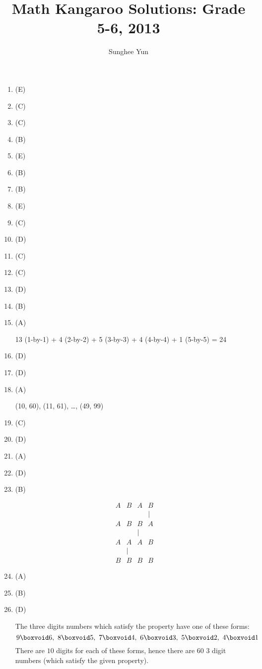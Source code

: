 \documentclass{article}
\title{Math Kangaroo Solutions: Grade 5-6, 2013}
\author{Sunghee Yun}
\begin{document}
\maketitle

\begin{enumerate}
\item (E)
\item (C)
\item (C)
\item (B)
\item (E)
\item (B)
\item (B)
\item (E)
\item (C)
\item (D)
\item (C)
\item (C)
\item (D)
\item (B)
\item (A)
\begin{solution}
13 (1-by-1)
+ 4 (2-by-2)
+ 5 (3-by-3)
+ 4 (4-by-4)
+ 1 (5-by-5)
= 24
\end{solution}
\item (D)
\item (D)
\item (A)
\begin{solution}
(10, 60), (11, 61), \ldots, (49, 99)
\end{solution}
\item (C)
\item (D)
\item (A)
\item (D)
\item (B)
\begin{solution}
\[
\begin{array}{cccc}
A&B&A&B
\\
 & & &|
\\
A&B&B&A
\\
 & &|
\\
A&A&A&B
\\
& |
\\
B&B&B&B
\end{array}
\]
\end{solution}

\item (A)
\item (B)
\item (D)
\begin{solution}
The three digits numbers which satisfy the property have one of these forms:
\[
9\boxvoid 6,
\ 8\boxvoid 5,
\ 7\boxvoid 4,
\ 6\boxvoid 3,
\ 5\boxvoid 2,
\ 4\boxvoid 1
\]
There are $10$ digits for each of these forms,
hence there are $60$ $3$ digit numbers
(which satisfy the given property).


\end{solution}
\end{enumerate}
\end{document}
